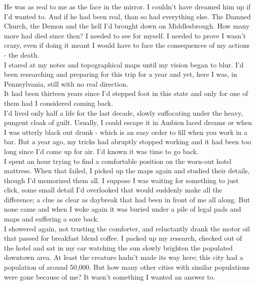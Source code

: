 \documentclass[a5paper]{scrartcl}
\begin{document}
He was as real to me as the face in the mirror. I couldn't have dreamed him up if I'd wanted to. And if he had been real, than so had everything else. The Damned Church, the Demon and the hell I'd brought down on Middlesbrough. How many more had died since then? I needed to see for myself. I needed to prove I wasn't crazy, even if doing it meant I would have to face the consequences of my actions - the death.  \\


I stared at my notes and topographical maps until my vision began to blur. I'd been researching and preparing for this trip for a year and yet, here I was, in Pennsylvania, still with no real direction.\\


It had been thirteen years since I'd stepped foot in this state and only for one of them had I considered coming back. \\


I'd lived only half a life for  the last decade, slowly suffocating under the heavy, pungent cloak of guilt. Usually, I could escape it in Ambien laced dreams or when I was utterly black out drunk - which is an easy order to fill when you work in a bar. But a year ago, my tricks had abruptly stopped working and it had been too long since I'd come up for air. I'd known it was time to go back.\\


I spent an hour trying to find a comfortable position on the worn-out hotel mattress. When that failed, I picked up the maps again and studied their details, though I'd memorized them all. I suppose I was waiting for something to just click, some small detail I'd overlooked that would suddenly make all the difference; a clue as clear as daybreak that had been in front of me all along. But none came and when I woke again it was buried under a pile of legal pads and maps and suffering a sore back.\\


I showered again, not trusting the comforter, and reluctantly drank the motor oil that passed for breakfast blend coffee. I packed up my research, checked out of the hotel and sat in my car watching the sun slowly brighten the populated downtown area. At least the creature hadn't made its way here; this city had a population of around 50,000. But how many other cities with similar populations were gone because of me? It wasn't something I wanted an answer to.\\
\end{document}
